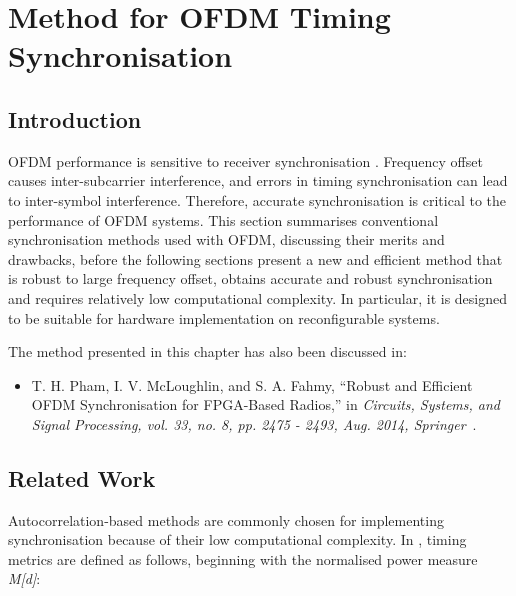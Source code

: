 \chapter{Method for OFDM Timing Synchronisation}
\label{chap:Synchronisation}

\section{Introduction}
OFDM performance is sensitive to receiver synchronisation \cite{Hanzo2006}.
Frequency offset causes inter-subcarrier interference, and errors in timing synchronisation can lead to inter-symbol interference.
Therefore, accurate synchronisation is critical to the performance of OFDM systems.
This section summarises conventional synchronisation methods used with OFDM, discussing their merits and drawbacks, before the following sections present a new and efficient method that is robust to large frequency offset, obtains accurate  and robust synchronisation and requires relatively low computational complexity. In particular, it is designed to be suitable for hardware implementation on reconfigurable systems.

The method presented in this chapter has also been discussed in:
\begin{itemize}
\item T. H. Pham, I. V. McLoughlin, and S. A. Fahmy, ``Robust and Efficient OFDM Synchronisation for FPGA-Based Radios,'' in \textit{Circuits, Systems, and Signal Processing, vol. 33, no. 8, pp. 2475 - 2493, Aug. 2014, Springer}~\cite{Pham2014}.
\end{itemize}

\section{Related Work}
Autocorrelation-based methods are commonly chosen for implementing synchronisation because of their low computational complexity. In \cite{Schmidl1997}, timing metrics are defined as follows, beginning with the normalised power measure \emph{M[d]}:


